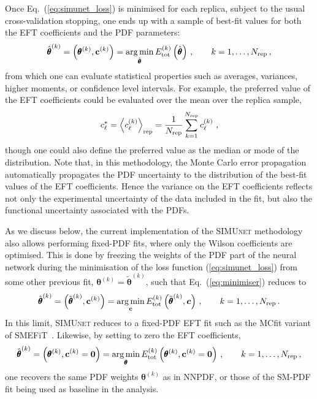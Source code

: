 \documentclass[withindex,glossary]{cam-thesis}
\renewcommand{\vec}[1]{\textbf{#1}} %
\newcommand{\simunet}{\textsc{SIMUnet}}
\DeclareMathOperator*{\argmin}{arg\,min}
\begin{document}
%
Once Eq.~(\ref{eq:simunet_loss}) is minimised for each replica, subject
to the usual cross-validation stopping, one ends up with a sample of
best-fit values for both the EFT
coefficients and the PDF parameters:
\begin{equation}
  \label{eq:minimiser}
  \hat{\pmb{\theta}}^{(k)}
  = \left( \pmb{\theta}^{(k)}, \vec{c}^{(k)}  \right)
  = \argmin_{\hat{\pmb{\theta}}}  E_{\rm tot}^{(k)}\left( \hat{\pmb{\theta}}\right)  \, ,\qquad k=1,\ldots, N_{\rm rep} \, ,
\end{equation}
from which one can evaluate statistical properties such as averages,
variances, higher moments, or confidence level intervals.
For example, the preferred value of the EFT coefficients
could be evaluated over the mean over the replica sample,
\begin{equation}
  c_\ell^* = \left\langle c_\ell^{(k)} \right\rangle_{\rm rep} =
  \frac{1}{N_{\rm rep}}\sum_{k=1}^{N_{\rm rep}}  c_\ell^{(k)}
  \ ,
\end{equation}
though one could also define the preferred value as the median or mode
of the distribution. Note that, in this methodology, the Monte Carlo
error propagation automatically propagates the PDF uncertainty to the
distribution of the best-fit values of the EFT
coefficients. Hence the variance on the EFT coefficients reflects not
only the experimental uncertainty of the data included in the fit, but
also the functional uncertainty associated with the PDFs.

As we discuss below, the current implementation of the 
\simunet{} methodology also allows performing fixed-PDF fits, where
only the Wilson coefficients are optimised. This is done by freezing the weights
 of the PDF part of the neural network during the minimisation of the loss function
 (\ref{eq:simunet_loss}) from some other previous fit, $\boldsymbol{{\theta}}^{(k)}=
 \boldsymbol{\widetilde{\theta}}^{(k)}$, such that Eq.~(\ref{eq:minimiser})
 reduces to
 \begin{equation}
  \label{eq:minimiser2}
  \hat{\pmb{\theta}}^{(k)}
  = \left( \tilde{\pmb{\theta}}^{(k)}, \vec{c}^{(k)}  \right)
  = \argmin_{\vec{c}}  E_{\rm tot}^{(k)}\left( \tilde{\pmb{\theta}}^{(k)},
    \boldsymbol{c} \right)  \, ,\qquad k=1,\ldots, N_{\rm rep} \, .
 \end{equation}
In this limit, \simunet{} reduces to a fixed-PDF EFT fit such as the
 MCfit variant of {\sc\small SMEFiT}~\cite{Giani:2023gfq}. 
 Likewise, by setting to zero the EFT coefficients,
 \begin{equation}
  \label{eq:minimiser3}
  \hat{\pmb{\theta}}^{(k)}
  = \left( \pmb{\theta}^{(k)}, \vec{c}^{(k)} =\vec{0} \right)
  = \argmin_{\pmb{\theta}}  E_{\rm tot}^{(k)}\left( \pmb{\theta}^{(k)},
    \vec{c}^{(k)}=\vec{0} \right)  \, ,\qquad k=1,\ldots, N_{\rm rep} \, ,
 \end{equation}
 one recovers the same PDF weights $\pmb{\theta}^{(k)}$
 as in NNPDF, or those of the SM-PDF fit being used as baseline in
 the analysis. 
\end{document}
